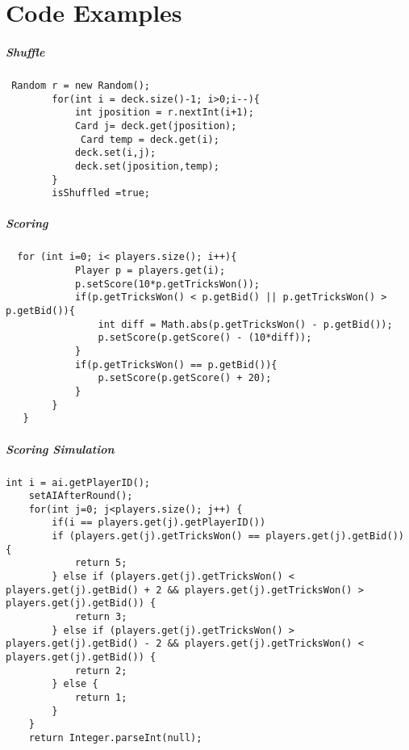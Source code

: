\chapter{Code Examples}

\paragraph{Shuffle}
\begin{verbatim}
 Random r = new Random();
        for(int i = deck.size()-1; i>0;i--){
            int jposition = r.nextInt(i+1);
            Card j= deck.get(jposition);
             Card temp = deck.get(i);
            deck.set(i,j);
            deck.set(jposition,temp);
        }
        isShuffled =true;
\end{verbatim}
\paragraph{Scoring}
\begin{verbatim}
  for (int i=0; i< players.size(); i++){
            Player p = players.get(i);
            p.setScore(10*p.getTricksWon());
            if(p.getTricksWon() < p.getBid() || p.getTricksWon() > p.getBid()){
                int diff = Math.abs(p.getTricksWon() - p.getBid());
                p.setScore(p.getScore() - (10*diff));
            }
            if(p.getTricksWon() == p.getBid()){
                p.setScore(p.getScore() + 20);
            }
        }
   }
\end{verbatim}
\paragraph{Scoring Simulation}
\begin{verbatim}
int i = ai.getPlayerID();
    setAIAfterRound();
    for(int j=0; j<players.size(); j++) {
        if(i == players.get(j).getPlayerID())
        if (players.get(j).getTricksWon() == players.get(j).getBid()) {
            return 5;
        } else if (players.get(j).getTricksWon() < players.get(j).getBid() + 2 && players.get(j).getTricksWon() > players.get(j).getBid()) {
            return 3;
        } else if (players.get(j).getTricksWon() > players.get(j).getBid() - 2 && players.get(j).getTricksWon() < players.get(j).getBid()) {
            return 2;
        } else {
            return 1;
        }
    }
    return Integer.parseInt(null);
\end{verbatim}
